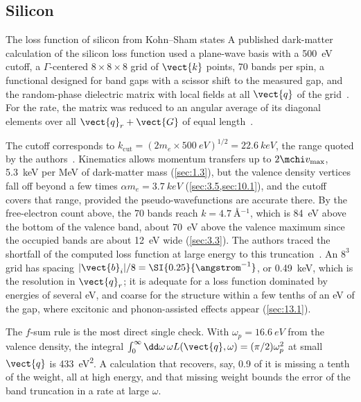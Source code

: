 \subsection{Silicon}

\begin{workedexample}{The loss function of silicon from Kohn--Sham states}\label{we:E-elf-si}
A published dark-matter calculation of the silicon loss function used a plane-wave basis with a \SI{500}{eV} cutoff, a $\Gamma$-centered $8\times8\times8$ grid of $\vect{k}$ points, 70 bands per spin, a functional designed for band gaps with a scissor shift to the measured gap, and the random-phase dielectric matrix with local fields at all $\vect{q}$ of the grid~\cite{knapen2021dark}. For the rate, the matrix was reduced to an angular average of its diagonal elements over all $\vect{q}_r + \vect{G}$ of equal length~\cite[Eq.~(24)]{knapen2021dark}.

The cutoff corresponds to $k_{\mathrm{cut}} = (2m_e\times\SI{500}{eV})^{1/2} = \SI{22.6}{keV}$, the range quoted by the authors~\cite{knapen2021dark}. Kinematics allows momentum transfers up to $2\mchi v_{\mathrm{max}}$, \SI{5.3}{keV} per MeV of dark-matter mass (\cref{sec:1.3}), but the valence density vertices fall off beyond a few times $\alpha m_e = \SI{3.7}{keV}$ (\cref{sec:3.5,sec:10.1}), and the cutoff covers that range, provided the pseudo-wavefunctions are accurate there. By the free-electron count above, the 70 bands reach $k = \SI{4.7}{\angstrom^{-1}}$, which is \SI{84}{eV} above the bottom of the valence band, about \SI{70}{eV} above the valence maximum since the occupied bands are about \SI{12}{eV} wide (\cref{sec:3.3}). The authors traced the shortfall of the computed loss function at large energy to this truncation~\cite{knapen2021dark}. An $8^3$ grid has spacing $|\vect{b}_i|/8 = \SI{0.25}{\angstrom^{-1}}$, or \SI{0.49}{keV}, which is the resolution in $\vect{q}_r$; it is adequate for a loss function dominated by energies of several eV, and coarse for the structure within a few tenths of an eV of the gap, where excitonic and phonon-assisted effects appear (\cref{sec:13.1}).

The $f$-sum rule is the most direct single check. With $\omega_p = \SI{16.6}{eV}$ from the valence density, the integral $\int_0^\infty\dd\omega\,\omega L(\vect{q},\omega) = (\pi/2)\omega_p^2$ at small $\vect{q}$ is \SI{433}{eV^2}. A calculation that recovers, say, 0.9 of it is missing a tenth of the weight, all at high energy, and that missing weight bounds the error of the band truncation in a rate at large $\omega$.
\end{workedexample}

